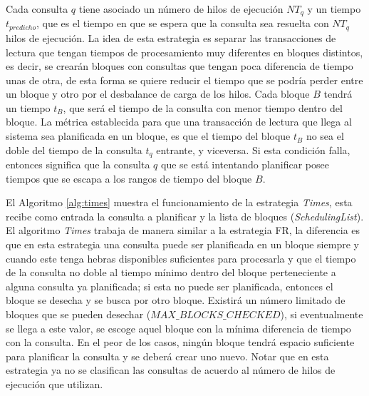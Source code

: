 Cada consulta $q$ tiene asociado un número de hilos de ejecución $NT_q$ y un tiempo $t_{predicho}$, que es el tiempo en que se espera que la consulta sea resuelta con $NT_q$ hilos de ejecución. La idea de esta estrategia es separar las transacciones de lectura que tengan tiempos de procesamiento muy diferentes en bloques distintos, es decir, se crearán bloques con consultas que tengan poca diferencia de tiempo unas de otra, de esta forma se quiere reducir el tiempo que se podría perder entre un bloque y otro por el desbalance de carga de los hilos. Cada bloque $B$ tendrá un tiempo $t_B$, que será el tiempo de la consulta con menor tiempo dentro del bloque. La métrica establecida para que una transacción de lectura que llega al sistema sea planificada en un bloque, es que el tiempo del bloque $t_B$ no sea el doble del tiempo de la consulta $t_q$ entrante, y viceversa. Si esta condición falla, entonces significa que la consulta $q$ que se está intentando planificar posee tiempos que se escapa a los rangos de tiempo del bloque $B$.

El Algoritmo \ref{alg:times} muestra el funcionamiento de la estrategia \textit{Times}, esta recibe como entrada la consulta a planificar y la lista de bloques (\textit{SchedulingList}). El algoritmo \textit{Times} trabaja de manera similar a la estrategia FR, la diferencia es que en esta estrategia una consulta puede ser planificada en un bloque siempre y cuando este tenga hebras disponibles suficientes para procesarla y que el tiempo de la consulta no doble al tiempo mínimo dentro del bloque perteneciente a alguna consulta ya planificada; si esta no puede ser planificada, entonces el bloque se desecha y se busca por otro bloque. Existirá un número limitado de bloques que se pueden desechar (\textit{$MAX\_BLOCKS\_CHECKED$}), si eventualmente se llega a este valor, se escoge aquel bloque con la mínima diferencia de tiempo con la consulta. En el peor de los casos, ningún bloque tendrá espacio suficiente para planificar la consulta y se deberá crear uno nuevo. Notar que en esta estrategia ya no se clasifican las consultas de acuerdo al número de hilos de ejecución que utilizan. 

